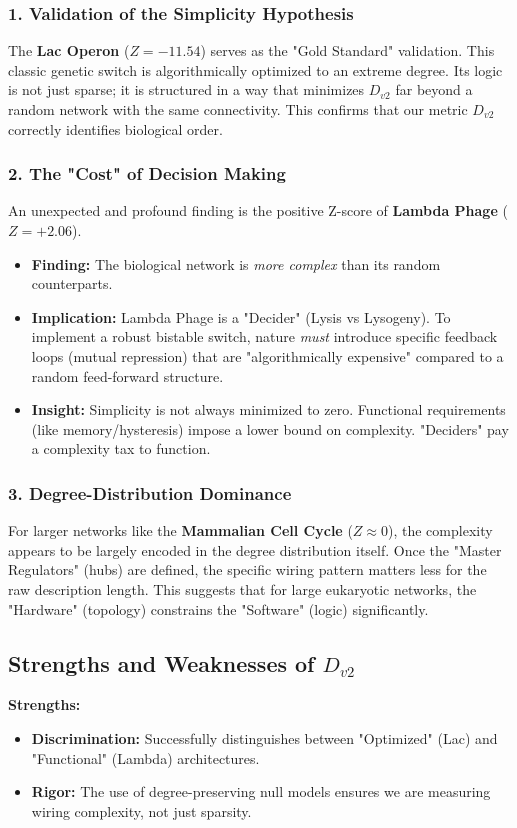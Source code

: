 \subsubsection{1. Validation of the Simplicity Hypothesis}
The \textbf{Lac Operon} ($Z = -11.54$) serves as the "Gold Standard" validation. This classic genetic switch is algorithmically optimized to an extreme degree. Its logic is not just sparse; it is structured in a way that minimizes $D_{v2}$ far beyond a random network with the same connectivity. This confirms that our metric $D_{v2}$ correctly identifies biological order.

\subsubsection{2. The "Cost" of Decision Making}
An unexpected and profound finding is the positive Z-score of \textbf{Lambda Phage} ($Z = +2.06$).
\begin{itemize}
    \item \textbf{Finding:} The biological network is \textit{more complex} than its random counterparts.
    \item \textbf{Implication:} Lambda Phage is a "Decider" (Lysis vs Lysogeny). To implement a robust bistable switch, nature \textit{must} introduce specific feedback loops (mutual repression) that are "algorithmically expensive" compared to a random feed-forward structure.
    \item \textbf{Insight:} Simplicity is not always minimized to zero. Functional requirements (like memory/hysteresis) impose a lower bound on complexity. "Deciders" pay a complexity tax to function.
\end{itemize}

\subsubsection{3. Degree-Distribution Dominance}
For larger networks like the \textbf{Mammalian Cell Cycle} ($Z \approx 0$), the complexity appears to be largely encoded in the degree distribution itself. Once the "Master Regulators" (hubs) are defined, the specific wiring pattern matters less for the raw description length. This suggests that for large eukaryotic networks, the "Hardware" (topology) constrains the "Software" (logic) significantly.

\subsection{Strengths and Weaknesses of $D_{v2}$}
\textbf{Strengths:}
\begin{itemize}
    \item \textbf{Discrimination:} Successfully distinguishes between "Optimized" (Lac) and "Functional" (Lambda) architectures.
    \item \textbf{Rigor:} The use of degree-preserving null models ensures we are measuring wiring complexity, not just sparsity.
\end{itemize}

